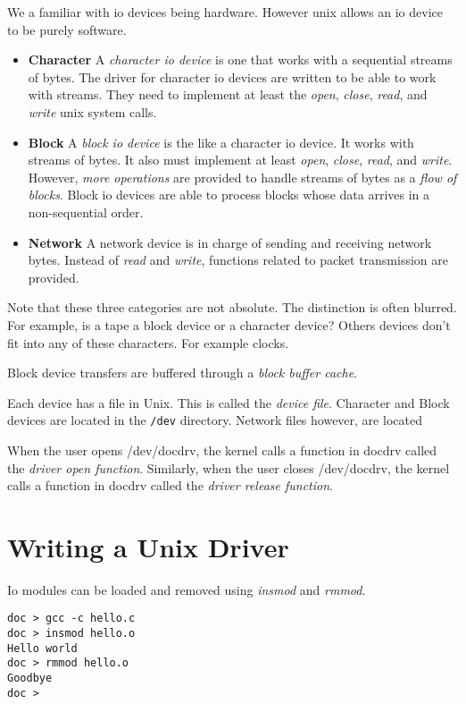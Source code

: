 We a familiar with io devices being hardware.
However unix allows an io device to be purely software. 


\begin{itemize}   
\renewcommand{\labelitemi}{$\Box$}
\item \textbf{Character} 
A \textit{character io device} is one that works with a sequential streams of bytes. 
The driver for character io devices are written to be able to work with streams.
They need to implement at least the \textit{open}, \textit{close}, \textit{read}, and 
\textit{write} unix system calls. 
\item \textbf{Block} 
A \textit{block io device} is the like a character io device. 
It works with streams of bytes. It also must implement at least \textit{open}, \textit{close}, \textit{read}, and \textit{write}. However, \textit{more operations} are provided to handle streams of bytes as a \textit{flow of blocks}. Block io devices are 
able to process blocks whose data arrives in a non-sequential order.
\item \textbf{Network} 
A network device is in charge of sending and receiving network bytes.
Instead of \textit{read} and \textit{write}, functions
related to packet transmission are provided.
\end{itemize}

Note that these three categories are not absolute. 
The distinction is often blurred. For example, is a tape a 
block device or a character device? Others devices don't fit 
into any of these characters.
For example clocks.


Block device transfers are buffered through a \textit{block buffer cache}.

Each device has a file in Unix. This is called the \textit{device file}.
Character and Block devices are located in the \lstinline{/dev} directory.
Network files however, are located 

When the user opens /dev/docdrv, the kernel calls a function in docdrv called the
\textit{driver open function}. Similarly, when the user closes /dev/docdrv, 
the kernel calls a function in docdrv called the \textit{driver release function}.



\section{Writing a Unix Driver}

Io modules can be loaded and removed using \textit{insmod} and \textit{rmmod}.

\begin{lstlisting}
doc > gcc -c hello.c
doc > insmod hello.o
Hello world
doc > rmmod hello.o
Goodbye
doc >
\end{lstlisting}